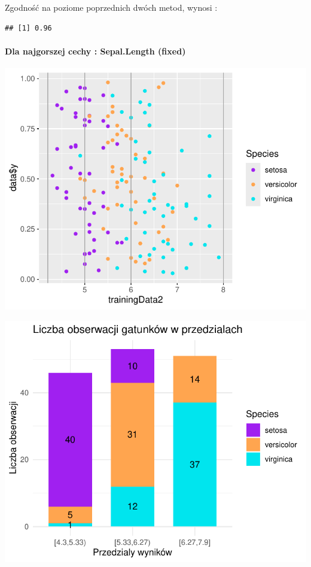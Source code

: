 \documentclass[
  12pt,
]{article}
\begin{document}
Zgodność na poziome poprzednich dwóch metod, wynosi :

\begin{verbatim}
## [1] 0.96
\end{verbatim}

\paragraph{Dla najgorszej cechy : Sepal.Length
(fixed)}\label{dla-najgorszej-cechy-sepal.length-fixed}

\begin{center}\includegraphics{Sprawozdanie2_files/figure-latex/givenRanges_najg-1} \end{center}

\begin{center}\includegraphics{Sprawozdanie2_files/figure-latex/tabela_kondygnacji_4_najg-1} \end{center}
\end{document}
